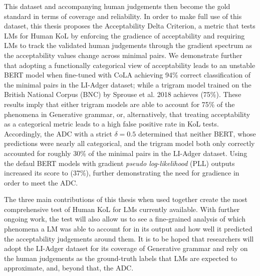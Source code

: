 This dataset and accompanying human judgements then become the gold standard in terms of coverage and reliability.  In order to make full use of this dataset, this thesis proposes the Acceptability Delta Criterion, a metric that tests LMs for Human KoL by enforcing the gradience of acceptability and requiring LMs to track the validated human judgements through the gradient spectrum as the acceptability values change across minimal pairs.  We demonstrate further that adopting a functionally categorical view of acceptability leads to an unstable BERT model when fine-tuned with CoLA achieving 94\% correct classification of the minimal pairs in the LI-Adger dataset; while a trigram model trained on the British National Corpus (BNC) by Sprouse et al. 2018 achieves (75\%).  These results imply that either trigram models are able to account for 75\% of the phenomena in Generative grammar, or, alternatively, that treating acceptability as a categorical metric leads to a high false positive rate in KoL tests.  Accordingly, the ADC with a strict $\delta=0.5$ determined that neither BERT, whose predictions were nearly all categorical, and the trigram model both only correctly accounted for roughly 30\% of the minimal pairs in the LI-Adger dataset.  Using the defaul BERT models with gradient \textit{pseudo log-likelihood} (PLL) outputs increased its score to (37\%), further demonstrating the need for gradience in order to meet the ADC.

The three main contributions of this thesis when used together create the most comprehensive test of Human KoL for LMs currently available.  With further ongoing work, the test will also allow us to see a fine-grained analysis of which phenomena a LM was able to account for in its output and how well it predicted the acceptability judgements around them.  It is to be hoped that researchers will adopt the LI-Adger dataset for its coverage of Generative grammar and rely on the human judgements as the ground-truth labels that LMs are expected to approximate, and, beyond that, the ADC.